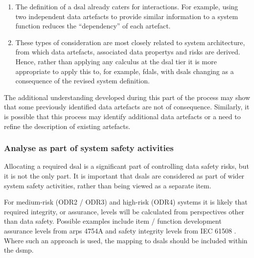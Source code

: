 \begin{enumerate}
	\item The definition of a \gls{dsal} already caters for interactions. For example, using two independent \glspl{data artefact} to provide similar \gls{information} to a system function reduces the ``dependency'' of each artefact.
	\item These types of consideration are most closely related to system architecture, from which \glspl{data artefact}, associated \glspl{data property} and risks are derived. Hence, rather than applying any calculus at the \gls{dsal} tier it is more appropriate to apply this to, for example, \glspl{fdal}, with \glspl{dsal} changing as a consequence of the revised system definition.
\end{enumerate}

The additional understanding developed during this part of the process may show that some previously identified \glspl{data artefact} are not of consequence. Similarly, it is possible that this process may identify additional \glspl{data artefact} or a need to refine the description of existing artefacts.

\subsubsection{Analyse  as part of system safety activities}
\label{bkm:activities:analyse:partofsystemsafetyactivities}
Allocating a required \gls{dsal} is a significant part of controlling data safety risks, but it is not the only part. It is important that \glspl{dsal} are considered as part of wider system safety activities, rather than being viewed as a separate item.

For medium-risk (ODR2 / ODR3) and high-risk (ODR4) systems it is likely that required \gls{integrity}, or assurance, levels will be calculated from perspectives other than data safety. Possible examples include item / function development assurance levels from \glspl{arp} 4754A \cite{citation:arp4754a2010guidelines} and safety \gls{integrity} levels from IEC 61508 \cite{citation:iec615083}.
Where such an approach is used, the mapping to \glspl{dsal} should be included within the \gls{dsmp}.

